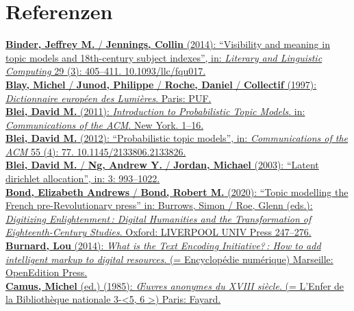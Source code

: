 \documentclass[
  12pt,
  letterpaper,
  DIV=11,
  numbers=noendperiod]{scrreprt}
\begin{document}
\section{}\label{section-3}

\section{Referenzen}\label{referenzen}

\href{https://www.zotero.org/google-docs/?fqBRoB}{\textbf{Binder,
Jeffrey M.} / \textbf{Jennings, Collin} (2014): ``Visibility and meaning
in topic models and 18th-century subject indexes'', in: \emph{Literary
and Linguistic Computing} 29 (3): 405--411. 10.1093/llc/fqu017.}\\
\href{https://www.zotero.org/google-docs/?fqBRoB}{\textbf{Blay, Michel}
/ \textbf{Junod, Philippe} / \textbf{Roche, Daniel} / \textbf{Collectif}
(1997): \emph{Dictionnaire européen des Lumières}. Paris: PUF.}\\
\href{https://www.zotero.org/google-docs/?fqBRoB}{\textbf{Blei, David
M.} (2011): \emph{Introduction to Probabilistic Topic Models}. in:
\emph{Communications of the ACM}. New York. 1--16.}\\
\href{https://www.zotero.org/google-docs/?fqBRoB}{\textbf{Blei, David
M.} (2012): ``Probabilistic topic models'', in: \emph{Communications of
the ACM} 55 (4): 77. 10.1145/2133806.2133826.}\\
\href{https://www.zotero.org/google-docs/?fqBRoB}{\textbf{Blei, David
M.} / \textbf{Ng, Andrew Y.} / \textbf{Jordan, Michael} (2003): ``Latent
dirichlet allocation'', in: 3: 993--1022.}\\
\href{https://www.zotero.org/google-docs/?fqBRoB}{\textbf{Bond,
Elizabeth Andrews} / \textbf{Bond, Robert M.} (2020): ``Topic modelling
the French pre-Revolutionary press'' in: Burrows, Simon / Roe, Glenn
(eds.): \emph{Digitizing Enlightenment\,: Digital Humanities and the
Transformation of Eighteenth-Century Studies}. Oxford: LIVERPOOL UNIV
Press 247--276.}\\
\href{https://www.zotero.org/google-docs/?fqBRoB}{\textbf{Burnard, Lou}
(2014): \emph{What is the Text Encoding Initiative?\,: How to add
intelligent markup to digital resources}. (= Encyclopédie numérique)
Marseille: OpenEdition Press.}\\
\href{https://www.zotero.org/google-docs/?fqBRoB}{\textbf{Camus, Michel}
(ed.) (1985): \emph{Œuvres anonymes du XVIII siècle}. (= L'Enfer de la
Bibliothèque nationale 3-\textless5, 6 \textgreater) Paris: Fayard.}\\
\end{document}

